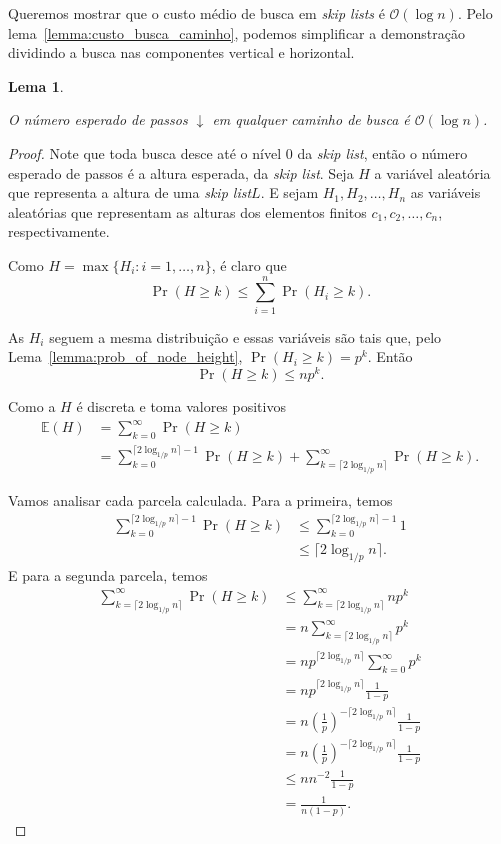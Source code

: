 \documentclass[paper=a4, fontsize=11pt]{scrartcl} %
\newtheorem{lemma}[theorem]{Lema}
\numberwithin{equation}{section}
\numberwithin{figure}{section}
\numberwithin{table}{section}
\numberwithin{definition}{section}
\numberwithin{theorem}{section}
\numberwithin{property}{section}
\numberwithin{proposition}{section}
\newcommand{\cO}{\ensuremath{\mathcal{O}}}
\newcommand{\sls}{\textit{skip lists}\xspace}
\newcommand{\skl}{\textit{skip list}\xspace}
\newcommand{\Exp}{\ensuremath{{\mathbb{E}}}\xspace}
\begin{document}
Queremos mostrar que o custo médio de busca em \sls é $\cO(\log n)$. Pelo lema~\ref{lemma:custo_busca_caminho},
podemos simplificar a demonstração dividindo a busca nas componentes vertical e horizontal.

\begin{lemma} \label{lemma:downarrow}

O número esperado de passos $\downarrow$ em qualquer caminho de busca é $\cO(\log n)$.

\end{lemma}

\begin{proof}

Note que toda busca desce até o nível 0 da \skl, então o número esperado de passos é a altura esperada, da \skl. Seja $H$ a variável aleatória que representa a altura de uma \skl $L$. E sejam 
$H_1, H_2, \ldots, H_n$ as variáveis aleatórias que representam as alturas dos elementos finitos
$c_1, c_2, \ldots, c_n$, respectivamente.

Como $H = \max \{H_i : i = 1, \ldots, n \}$, é claro que
$$
\Pr(H \geq k) \leq \sum_{i=1}^n \Pr(H_i \geq k).
$$

As $H_i$ seguem a mesma distribuição e essas variáveis são tais que, pelo Lema~\ref{lemma:prob_of_node_height},  
 $ \Pr(H_i \geq k) = p^k$. Então
$$
\Pr(H \geq k) \leq np^k.
$$

Como a $H$ é discreta e toma valores positivos
\begin{align*}
\Exp(H) &= \sum_{k = 0}^{\infty} \Pr(H \geq k)  \\
        &= \sum_{k = 0}^{\lceil 2 \log_{1/p} n \rceil - 1} \Pr(H \geq k) +
        \sum_{k = \lceil 2 \log_{1/p} n \rceil}^{\infty} \Pr(H \geq k).
\end{align*}

Vamos analisar cada parcela calculada. Para a primeira, temos
\begin{align*}
\sum_{k = 0}^{\lceil 2 \log_{1/p} n \rceil - 1} \Pr(H \geq k) &\leq 
  \sum_{k = 0}^{\lceil 2 \log_{1/p} n \rceil - 1} 1 \\
&\leq \lceil 2 \log_{1/p} n \rceil.
\end{align*}
E para a segunda parcela, temos
\begin{align*}
\sum_{k = \lceil 2 \log_{1/p} n \rceil}^{\infty} \Pr(H \geq k) 
   &\leq \sum_{k = \lceil 2 \log_{1/p} n \rceil}^{\infty} np^k \\
   &= n \sum_{k = \lceil 2 \log_{1/p} n \rceil}^{\infty} p^k \\
   &= n p^{\lceil 2 \log_{1/p} n \rceil} \sum_{k = 0}^{\infty} p^k \\
   &= n p^{\lceil 2 \log_{1/p} n \rceil} \frac{1}{1 - p} \\
   &= n \left( \frac{1}{p} \right)^{- \lceil 2 \log_{1/p} n \rceil} \frac{1}{1 - p} \\
   &= n \left( \frac{1}{p} \right)^{- \lceil 2 \log_{1/p} n \rceil} \frac{1}{1 - p} \\
   &\leq n n^{-2} \frac{1}{1 - p} \\
   &= \frac{1}{n(1 - p)}.
\end{align*}


\end{proof}
\end{document}
